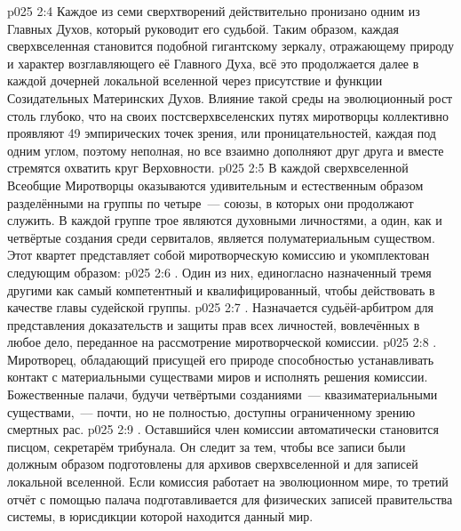 \vs p025 2:4 Каждое из семи сверхтворений действительно пронизано одним из Главных Духов, который руководит его судьбой. Таким образом, каждая сверхвселенная становится подобной гигантскому зеркалу, отражающему природу и характер возглавляющего её Главного Духа, всё это продолжается далее в каждой дочерней локальной вселенной через присутствие и функции Созидательных Материнских Духов. Влияние такой среды на эволюционный рост столь глубоко, что на своих постсверхвселенских путях миротворцы коллективно проявляют 49 эмпирических точек зрения, или проницательностей, каждая под одним углом, поэтому неполная, но все взаимно дополняют друг друга и вместе стремятся охватить круг Верховности.
\vs p025 2:5 \pc В каждой сверхвселенной Всеобщие Миротворцы оказываются удивительным и естественным образом разделёнными на группы по четыре~--- союзы, в которых они продолжают служить. В каждой группе трое являются духовными личностями, а один, как и четвёртые создания среди сервиталов, является полуматериальным существом. Этот квартет представляет собой миротворческую комиссию и укомплектован следующим образом:
\vs p025 2:6 . Один из них, единогласно назначенный тремя другими как самый компетентный и квалифицированный, чтобы действовать в качестве главы судейской группы.
\vs p025 2:7 . Назначается судьёй\hyp{}арбитром для представления доказательств и защиты прав всех личностей, вовлечённых в любое дело, переданное на рассмотрение миротворческой комиссии.
\vs p025 2:8 . Миротворец, обладающий присущей его природе способностью устанавливать контакт с материальными существами миров и исполнять решения комиссии. Божественные палачи, будучи четвёртыми созданиями~--- квазиматериальными существами,~--- почти, но не полностью, доступны ограниченному зрению смертных рас.
\vs p025 2:9 . Оставшийся член комиссии автоматически становится писцом, секретарём трибунала. Он следит за тем, чтобы все записи были должным образом подготовлены для архивов сверхвселенной и для записей локальной вселенной. Если комиссия работает на эволюционном мире, то третий отчёт с помощью палача подготавливается для физических записей правительства системы, в юрисдикции которой находится данный мир.

